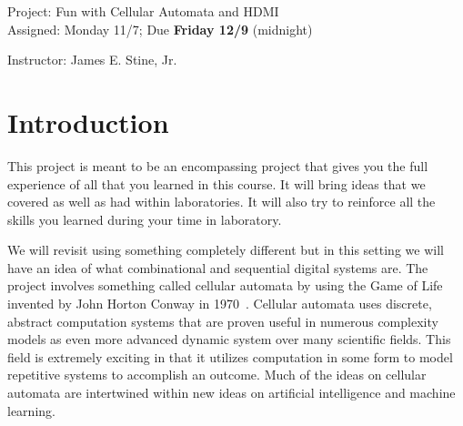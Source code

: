 \documentclass{article}
\newcommand{\myassignment}{Project: Fun with Cellular Automata and HDMI}
\newcommand{\myduedate}{Assigned: Monday 11/7; Due \textbf{Friday 12/9} (midnight)}
\newcommand{\myinstructor}{Instructor: James E. Stine, Jr.}
\begin{document}
\begin{center}
  {\huge \myassignment} \\
  {\large \myduedate} \\
  \begin{flushright}
  \myinstructor \\
  \end{flushright}
\end{center}

\section{Introduction}

This project is meant to be an encompassing project that gives you the
full experience of all that you learned in this course.  It will bring
ideas that we covered as well as had within laboratories.  It will
also try to reinforce all the skills you learned during your time in
laboratory.

We will revisit using something completely different but in this setting we
will have an idea of what combinational and sequential digital systems
are.
The project involves something called cellular automata by using the Game of Life invented by
John Horton Conway in 1970~\cite{games1970fantastic}. Cellular automata uses discrete, abstract computation systems
that are proven useful in numerous complexity models as even more advanced dynamic system
over many scientific fields. This field is extremely exciting in that it utilizes computation in
some form to model repetitive systems to accomplish an outcome.  Much
of the ideas on cellular automata are intertwined within new ideas on
artificial intelligence and machine learning.
\end{document}
